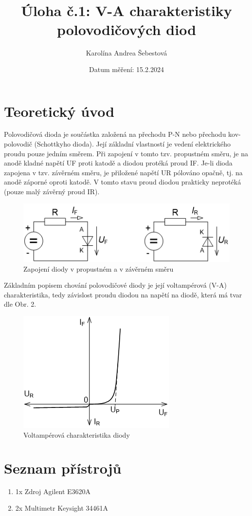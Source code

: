 \documentclass[a4paper, czech]{article}
\title{Úloha č.1: V-A charakteristiky polovodičových diod}
\author{Karolína Andrea Šebestová}
\date{Datum měření: 15.2.2024}
\begin{document}
\maketitle
\section[short]{Teoretický úvod}
Polovodičová dioda je součástka založená na přechodu P-N nebo přechodu kov-polovodič (Schottkyho dioda). Její základní vlastností je vedení elektrického proudu pouze jedním směrem. Při zapojení v tomto tzv. propustném směru, je na anodě kladné napětí UF proti katodě a diodou protéká proud IF. Je-li dioda zapojena v tzv. závěrném směru, je přiložené napětí UR pólováno opačně, tj. na anodě záporné oproti katodě. V tomto stavu proud diodou prakticky neprotéká (pouze malý závěrný proud IR).
\begin{figure}[H]
  \centering
  \includegraphics{zapojeni_diody}
  \caption{Zapojení diody v propustném a v závěrném směru}
  \label{obr:1}
\end{figure}

Základním popisem chování polovodičové diody je její voltampérová (V-A) charakteristika, tedy závislost proudu diodou na napětí na diodě, která má tvar dle Obr. 2.
\begin{figure}[H]
  \centering
  \includegraphics{va_charakteristika}
  \caption{Voltampérová charakteristika diody}
  \label{obr:2}
\end{figure}

\section[short]{Seznam přístrojů}
\begin{enumerate}
  \item 1x Zdroj Agilent E3620A
  \item 2x Multimetr Keysight 34461A
\end{enumerate}
\end{document}
